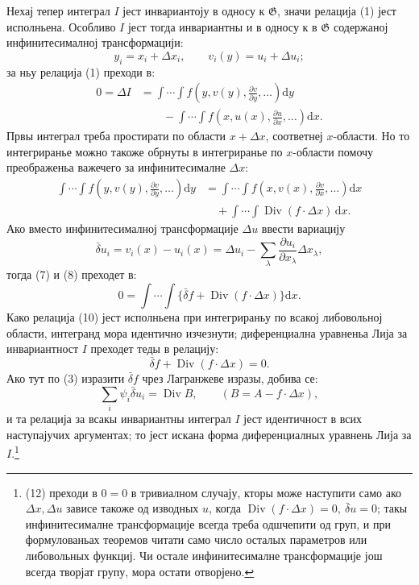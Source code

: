 ﻿\documentclass[11pt]{article}
\providecommand{\G}{\mathfrak G}
\providecommand{\D}{\Delta}
\providecommand{\p}{\partial}
\providecommand{\dd}{\mathrm d}
\DeclareMathOperator{\Div}{Div}
\providecommand{\bd}{\bar{\delta}}
\begin{document}
Нехај тепер интеграл \(I\) јест инвариантоју в односу к \(\G\), значи релација (1) јест исполньена. Особливо \(I\) јест тогда инвариантны и в односу к в \(\G\) содержаној инфинитесималној трансформацији:
\[
y_i=x_i+\D x_i,\qquad v_i(y)=u_i+\D u_i;
\]
за ньу релација (1) преходи в:
\begin{equation}
\begin{aligned}
0=\D I
&=\int\!\cdots\!\int f\!\left(y,v(y),\frac{\p v}{\p y},\ldots\right)\dd y\\
&\qquad-\int\!\cdots\!\int f\!\left(x,u(x),\frac{\p u}{\p x},\ldots\right)\dd x.
\end{aligned}
\tag{7}
\end{equation}
Првы интеграл треба простирати по области \(x+\D x\), соответнеј \(x\)-области. Но то интегриранье можно такоже обрнуты в интегриранье по \(x\)-области помочу преображеньа важечего за инфинитесималне \(\D x\):
\begin{equation}
\begin{aligned}
\int\!\cdots\!\int f\!\left(y,v(y),\frac{\p v}{\p y},\ldots\right)\dd y
&=\int\!\cdots\!\int f\!\left(x,v(x),\frac{\p v}{\p x},\ldots\right)\dd x\\
&\quad+\int\!\cdots\!\int \Div(f\cdot \D x)\,\dd x.
\end{aligned}
\tag{8}
\end{equation}
Ако вместо инфинитесималној трансформације \(\D u\) ввести вариацију
\begin{equation}
\bd u_i=v_i(x)-u_i(x)=\D u_i-\sum_\lambda\frac{\p u_i}{\p x_\lambda}\D x_\lambda,
\tag{9}
\end{equation}
тогда (7) и (8) преходет в:
\begin{equation}
0=\int\!\cdots\!\int\{\bd f+\Div(f\cdot\D x)\}\dd x.
\tag{10}
\end{equation}
Како релација (10) јест исполньена при интегрираньу по всакој либовольној области, интегранд мора идентично изчезнути; диференциална уравненьа Лија за инвариантност \(I\) преходет теды в релацију:
\begin{equation}
\bd f+\Div(f\cdot\D x)=0.
\tag{11}
\end{equation}
Ако тут по (3) изразити \(\bd f\) чрез Лагранжеве изразы, добива се:
\begin{equation}
\sum_i\psi_i\bd u_i=\Div B,\qquad (B=A-f\cdot\D x),
\tag{12}
\end{equation}
и та релација за всакы инвариантны интеграл \(I\) јест идентичност в всих наступајучих аргументах; то јест искана форма диференциалных уравнень Лија за \(I\).\footnote{(12) преходи в \(0=0\) в тривиалном случају, кторы може наступити само ако \(\D x,\D u\) зависе такоже од изводных \(u\), когда \(\Div(f\cdot\D x)=0,\ \bd u=0\); такы инфинитесималне трансформације всегда треба одшчепити од груп, и при формулованьах теоремов читати само число осталых параметров или либовольных функциј. Чи остале инфинитесималне трансформације још всегда творјат групу, мора остати отворјено.}
\end{document}
